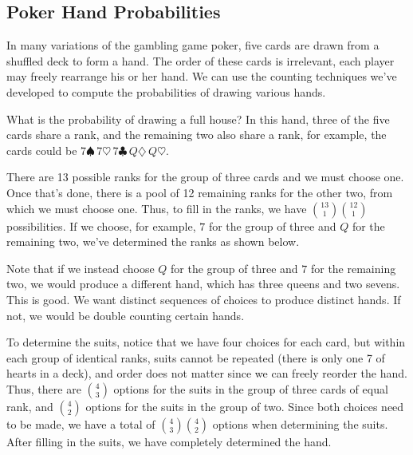 \subsection*{Poker Hand Probabilities}

In many variations of the gambling game poker, five cards are drawn from a shuffled deck to form a hand. The order of these cards is irrelevant, each player may freely rearrange his or her hand. We can use the counting techniques we've developed to compute the probabilities of drawing various hands.

\begin{examp}What is the probability of drawing a full house? In this hand, three of the five cards share a rank, and the remaining two also share a rank, for example, the cards could be $7 \spadesuit \, 7\heartsuit \, 7 \clubsuit \, Q \diamondsuit \, Q \heartsuit$.
\par
\noindent There are 13 possible ranks for the group of three cards and we must choose one. Once that's done, there is a pool of 12 remaining ranks for the other two, from which we must choose one. Thus, to fill in the ranks, we have $\binom{13}{1}\binom{12}{1}$ possibilities. If we choose, for example, $7$ for the group of three and $Q$ for the remaining two, we've determined the ranks as shown below.

\vspace{-1em}
\begin{center}
\end{center}
\vspace{-1em}

\noindent Note that if we instead choose $Q$ for the group of three and $7$ for the remaining two, we would produce a different hand, which has three queens and two sevens. This is good. We want distinct sequences of choices to produce distinct hands. If not, we would be double counting certain hands.
\par
\noindent To determine the suits, notice that we have four choices for each card, but within each group of identical ranks, suits cannot be repeated (there is only one 7 of hearts in a deck), and order does not matter since we can freely reorder the hand. Thus, there are $\binom{4}{3}$ options for the suits in the group of three cards of equal rank, and $\binom{4}{2}$ options for the suits in the group of two. Since both choices need to be made, we have a total of $\binom{4}{3}\binom{4}{2}$ options when determining the suits. After filling in the suits, we have completely determined the hand.


\end{examp}
